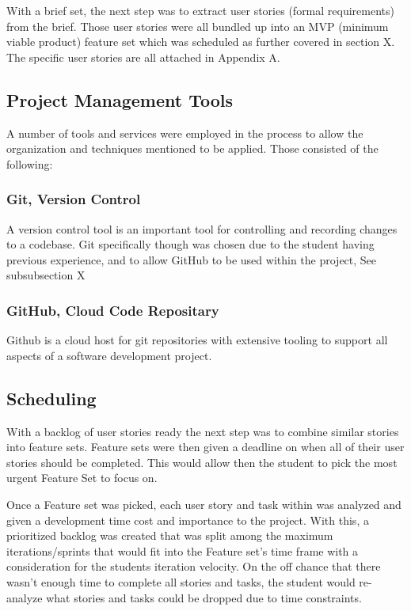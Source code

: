 With a brief set, the next step was to extract user stories (formal requirements) from the brief. Those user stories were all bundled up into an MVP (minimum viable product) feature set which was scheduled as further covered in section X. The specific user stories are all attached in Appendix A.

\subsection{Project Management Tools}
A number of tools and services were employed in the process to allow the organization and techniques mentioned to be applied. Those consisted of the following:

\subsubsection{Git, Version Control}
A version control tool is an important tool for controlling and recording changes to a codebase.
Git specifically though was chosen due to the student having previous experience, and to allow GitHub to be used within the project, See subsubsection X

\subsubsection{GitHub, Cloud Code Repositary}
Github is a cloud host for git repositories with extensive tooling to support all aspects of a software development project.

\subsection{Scheduling}
With a backlog of user stories ready the next step was to combine similar stories into feature sets. Feature sets were then given a deadline on when all of their user stories should be completed.
This would allow then the student to pick the most urgent Feature Set to focus on.

Once a Feature set was picked, each user story and task within was analyzed and given a development time cost and importance to the project. With this, a prioritized backlog was created that was split among the maximum iterations/sprints that would fit into the Feature set's time frame with a consideration for the students iteration velocity. On the off chance that there wasn't enough time to complete all stories and tasks, the student would re-analyze what stories and tasks could be dropped due to time constraints.

